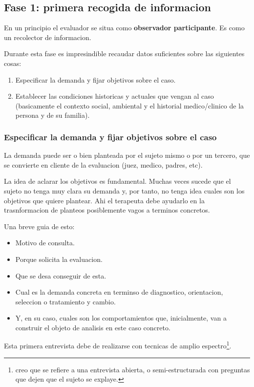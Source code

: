 \documentclass[12pt,a4paper]{article}
\begin{document}
\subsection{Fase 1: primera recogida de informacion}

En un principio el evaluador se situa como \textbf{observador participante}. Es como un recolector de informacion. 

Durante esta fase es impresindible recaudar datos suficientes sobre las siguientes cosas:

\begin{enumerate}
	\item Especificar la demanda y fijar objetivos sobre el caso.
	\item Establecer las condiciones historicas y actuales que vengan al caso (basicamente el contexto social, ambiental y el historial medico/clinico de la persona y de su familia).
\end{enumerate}

\subsubsection{Especificar la demanda y fijar objetivos sobre el caso}%

La demanda puede ser o bien planteada por el sujeto mismo o por un tercero, que se convierte en cliente de la evaluacion (juez, medico, padres, etc). 

La idea de aclarar los objetivos es fundamental. Muchas veces sucede que el sujeto no tenga muy clara su demanda y, por tanto, no tenga idea cuales son los objetivos que quiere plantear. Ahi el terapeuta debe ayudarlo en la trasnformacion de planteos posiblemente vagos a terminos concretos. 

Una breve guia de esto:

\begin{itemize}
	\item Motivo de consulta.
	\item Porque solicita la evaluacion.
	\item Que se desa conseguir de esta.
	\item Cual es la demanda concreta en terminso de diagnostico, orientacion, seleccion o tratamiento y cambio.
	\item Y, en su caso, cuales son los comportamientos que, inicialmente, van a construir el objeto de analisis en este caso concreto. 
\end{itemize}

Esta primera entrevista debe de realizarse con tecnicas de amplio espectro\footnote{creo que se refiere a una entrevista abierta, o semi-estructurada con preguntas que dejen que el sujeto se explaye.}. 
\end{document}
